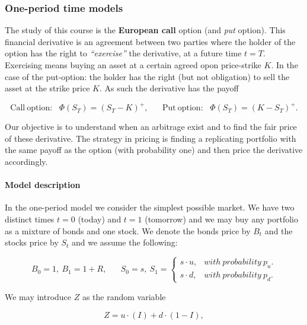 \documentclass[
]{article}
\begin{document}
\hypertarget{one-period-time-models}{%
\subsubsection{One-period time models}\label{one-period-time-models}}

The study of this course is the \textbf{European call} option (and
\emph{put} option). This financial derivative is an agreement between
two parties where the holder of the option has the right to
\emph{``exercise''} the derivative, at a future time \(t=T\). Exercising
means buying an asset at a certain agreed opon price-strike \(K\). In
the case of the put-option: the holder has the right (but not
obligation) to sell the asset at the strike price \(K\). As such the
derivative has the payoff

\[\text{Call}\ \text{option:}\hspace{10pt}\Phi(S_T)=(S_T-K)^+,\hspace{20pt}\text{Put}\ \text{option:}\hspace{10pt}\Phi(S_T)=(K-S_T)^+.\]

Our objective is to understand when an arbitrage exist and to find the
fair price of these derivative. The strategy in pricing is finding a
replicating portfolio with the same payoff as the option (with
probability one) and then price the derivative accordingly.

\hypertarget{model-description}{%
\paragraph{Model description}\label{model-description}}

In the one-period model we consider the simplest possible market. We
have two distinct times \(t=0\) (today) and \(t=1\) (tomorrow) and we
may buy any portfolio as a mixture of bonds and one stock. We denote the
bonds price by \(B_t\) and the stocks price by \(S_t\) and we assume the
following:

\[
B_0=1,\ B_1=1+R,\hspace{20pt}S_0=s,\ S_1=\left\{\begin{matrix}s\cdot u, & with\ probability\ p_u.\\s\cdot d, & with\ probability\ p_d.\end{matrix}\right.
\]

We may introduce \(Z\) as the random variable

\[
Z=u\cdot (I)+d\cdot (1-I),
\]
\end{document}
